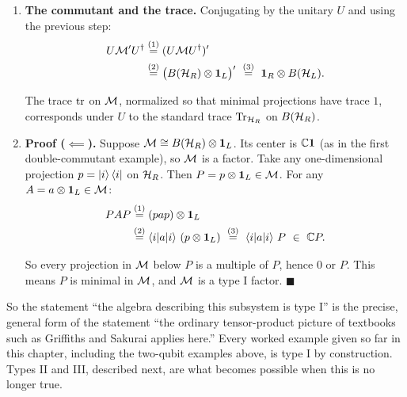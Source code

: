 \begin{itemize}
\begin{keyresult}
\begin{enumerate}[leftmargin=*]
\item \textbf{The commutant and the trace.}
Conjugating by the unitary $U$ and using the previous step:
\begin{align}
U \mathcal{M}' U^\dagger
&\overset{(1)}{=} (U \mathcal{M} U^\dagger)' \notag\\
&\overset{(2)}{=} \big(B(\mathcal{H}_R) \otimes \mathbf{1}_L\big)'
\ \overset{(3)}{=}\ \mathbf{1}_R \otimes B(\mathcal{H}_L) . \notag
\end{align}
\quad
{}\quad
{}

The trace $\operatorname{tr}$ on $\mathcal{M}$, normalized so that minimal projections have trace $1$, corresponds under $U$ to the
standard trace $\operatorname{Tr}_{\mathcal{H}_R}$ on $B(\mathcal{H}_R)$.

\item \textbf{Proof ($\impliedby$).}
Suppose $\mathcal{M} \cong B(\mathcal{H}_R) \otimes \mathbf{1}_L$. Its center is $\mathbb C\mathbf{1}$ (as in the first double-commutant
example), so $\mathcal{M}$ is a factor. Take any one-dimensional projection $p = \ket{i}\bra{i}$ on $\mathcal{H}_R$. Then
$P = p \otimes \mathbf{1}_L \in \mathcal{M}$. For any $A = a \otimes \mathbf{1}_L \in \mathcal{M}$:
\begin{align}
P A P
&\overset{(1)}{=} (p a p) \otimes \mathbf{1}_L \notag\\
&\overset{(2)}{=} \braket{i|a|i}\, (p \otimes \mathbf{1}_L)
\ \overset{(3)}{=}\ \braket{i|a|i}\, P \ \in\ \mathbb{C} P . \notag
\end{align}
\quad
{}\quad
{}

So every projection in $\mathcal{M}$ below $P$ is a multiple of $P$, hence $0$ or $P$. This means $P$ is minimal in
$\mathcal{M}$, and $\mathcal{M}$ is a type I factor. $\blacksquare$
\end{enumerate}
\end{keyresult}

So the statement ``the algebra describing this subsystem is type I'' is the precise, general form of the
statement ``the ordinary tensor-product picture of textbooks such as Griffiths and Sakurai applies here.''
Every worked example given so far in this chapter, including the two-qubit examples above, is type I by
construction. Types II and III, described next, are what becomes possible when this is no longer true.


\end{itemize}
